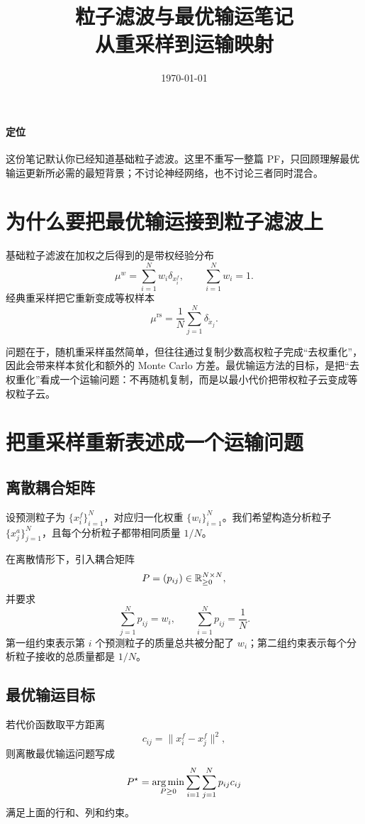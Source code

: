 \documentclass[12pt,a4paper]{ctexart}
\title{粒子滤波与最优输运笔记\\
\large 从重采样到运输映射}
\author{}
\date{\today}
\begin{document}
\maketitle
\tableofcontents

\paragraph{定位}
这份笔记默认你已经知道基础粒子滤波。这里不重写一整篇 PF，只回顾理解最优输运更新所必需的最短背景；不讨论神经网络，也不讨论三者同时混合。

\section{为什么要把最优输运接到粒子滤波上}

基础粒子滤波在加权之后得到的是带权经验分布
\[
\mu^w = \sum_{i=1}^N w_i \delta_{x_i^f},
\qquad
\sum_{i=1}^N w_i = 1.
\]
经典重采样把它重新变成等权样本
\[
\mu^{\mathrm{rs}} = \frac{1}{N}\sum_{j=1}^N \delta_{\tilde x_j}.
\]

问题在于，随机重采样虽然简单，但往往通过复制少数高权粒子完成“去权重化”，因此会带来样本贫化和额外的 Monte Carlo 方差。最优输运方法的目标，是把“去权重化”看成一个运输问题：不再随机复制，而是以最小代价把带权粒子云变成等权粒子云。

\section{把重采样重新表述成一个运输问题}

\subsection{离散耦合矩阵}

设预测粒子为 \(\{x_i^f\}_{i=1}^N\)，对应归一化权重 \(\{w_i\}_{i=1}^N\)。我们希望构造分析粒子 \(\{x_j^a\}_{j=1}^N\)，且每个分析粒子都带相同质量 \(1/N\)。

在离散情形下，引入耦合矩阵
\[
P = (p_{ij}) \in \mathbb{R}^{N \times N}_{\ge 0},
\]
并要求
\[
\sum_{j=1}^N p_{ij} = w_i,
\qquad
\sum_{i=1}^N p_{ij} = \frac{1}{N}.
\]
第一组约束表示第 \(i\) 个预测粒子的质量总共被分配了 \(w_i\)；第二组约束表示每个分析粒子接收的总质量都是 \(1/N\)。

\subsection{最优输运目标}

若代价函数取平方距离
\[
c_{ij} = \|x_i^f - x_j^f\|^2,
\]
则离散最优输运问题写成
\[
P^\star
=
\mathop{\mathrm{arg\,min}}_{P \ge 0}
\sum_{i=1}^N \sum_{j=1}^N p_{ij} c_{ij}
\]
满足上面的行和、列和约束。
\end{document}
